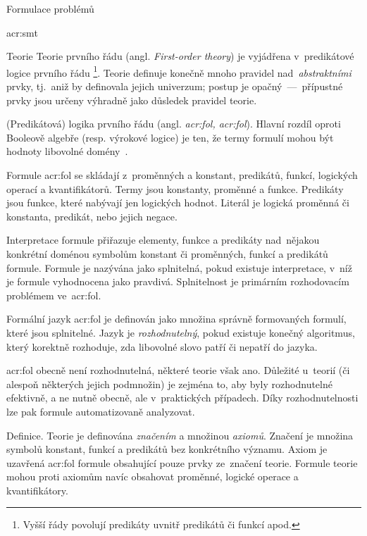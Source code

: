 \documentclass[thesis=M,czech]{FITthesis}[2012/06/26]
\newcommand{\acrlabel}[1]{acr:#1}
\newcommand{\acr}[1]{\acrshort{\acrlabel{#1}}}
\newcommand{\acrl}[1]{\acrlong{\acrlabel{#1}}}
\newcommand{\acrf}[1]{\acrfull{\acrlabel{#1}}}
\newcommand{\acrfc}[1]{\acrl{#1}, \acr{#1}}
\newcommand{\hl}[1]{\textit{#1}}
\newcommand{\name}[1]{\hl{#1}}
\newcommand{\cit}[1]{\cite{#1}}
\begin{document}
\begin{section}{Formulace problémů}
\begin{subsection}{\acrf{smt}}

\begin{subsubsection}{Teorie}\label{p:theory:formulation:smt:theory}
Teorie prvního řádu (angl. \name{First-order theory})
je vyjádřena v~predikátové logice prvního řádu%
\footnote{Vyšší řády povolují predikáty uvnitř predikátů či funkcí apod.}.
Teorie definuje konečně mnoho pravidel
nad~\hl{abstraktními} prvky,
tj.~aniž by definovala jejich univerzum;
postup je opačný~---~přípustné prvky
jsou určeny výhradně jako důsledek pravidel teorie.


\begin{paragraph}{(Predikátová) logika prvního řádu}
\label{p:theory:formulation:smt:theory:fol}
(angl. \name{\acrfc{fol}}).
Hlavní rozdíl oproti Booleově algebře
(resp. výrokové logice)
je ten, že termy formulí mohou být hodnoty
libovolné domény~\cit{theories-book}.

Formule \acr{fol} se skládají
z~proměnných a konstant, predikátů, funkcí,
logických operací a kvantifikátorů.
Termy jsou konstanty, proměnné a funkce.
Predikáty jsou funkce,
které nabývají jen logických hodnot.
Literál je logická proměnná či konstanta,
predikát, nebo jejich negace.

Interpretace formule přiřazuje
elementy, funkce a predikáty nad~nějakou konkrétní doménou
symbolům konstant či proměnných, funkcí a predikátů formule.
Formule je nazývána jako splnitelná,
pokud existuje interpretace,
v~níž je formule vyhodnocena jako pravdivá.
Splnitelnost je primárním rozhodovacím problémem ve~\acr{fol}.

Formální jazyk \acr{fol} je definován jako množina
správně formovaných formulí,
které jsou splnitelné.
Jazyk je \name{rozhodnutelný},
pokud existuje konečný algoritmus,
který korektně rozhoduje,
zda libovolné slovo patří či nepatří do jazyka.
\end{paragraph} %


\bigskip

\acr{fol} obecně není rozhodnutelná,
některé teorie však ano.
Důležité u~teorií
(či alespoň některých jejich podmnožin)
je zejména to,
aby byly rozhodnutelné efektivně,
a ne nutně obecně,
ale v~praktických případech.
Díky rozhodnutelnosti lze pak formule
automatizovaně analyzovat.


\begin{paragraph}{Definice.}\label{p:theory:formulation:smt:theory:def}
Teorie je definována
\name{značením} a množinou \name{axiomů}.
Značení je množina symbolů konstant, funkcí a predikátů
bez konkrétního významu.
Axiom je uzavřená \acr{fol} formule
obsahující pouze prvky ze~značení teorie.
Formule teorie mohou proti axiomům
navíc obsahovat proměnné, logické operace
a kvantifikátory.
\end{paragraph} %


\end{subsubsection}
\end{subsection}
\end{section}
\end{document}
